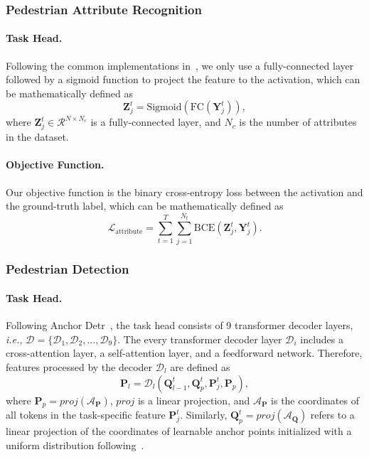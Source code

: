 \documentclass[10pt,twocolumn,letterpaper]{article}
\begin{document}
\subsubsection{Pedestrian Attribute Recognition}
\paragraph{Task Head.} Following the common implementations in~\cite{li2022label2label}, we only use a fully-connected layer followed by a sigmoid function to project the feature to the activation, which can be mathematically defined as 
\begin{equation}
    \mathbf{Z}^t_j =  \text{Sigmoid}(\text{FC}(\mathbf{Y}^t_j)),
\end{equation}
where $\mathbf{Z}^t_j \in \mathcal{R}^{N \times N_c}$  is a fully-connected layer, and $N_c$ is the number of attributes in the dataset. 
\paragraph{Objective Function.} Our objective function is the binary cross-entropy loss between the activation and the ground-truth label, which can be mathematically defined as
\begin{equation}
    \mathcal{L}_{\text{attribute}}  = \sum_{t=1}^T\sum_{j=1}^{N_t}\text{BCE}(\mathbf{Z}^t_j, \mathbf{Y}^t_j).
\end{equation}

\subsubsection{Pedestrian Detection}
\paragraph{Task Head.} Following Anchor Detr~\cite{wang2022anchor}, the task head consists of 9 transformer decoder layers, \emph{i.e.,} $\mathcal{D}\!=\!\{\mathcal{D}_1, \mathcal{D}_2, ..., \mathcal{D}_9\}$. The every transformer decoder layer $\mathcal{D}_i$ includes a cross-attention layer, a self-attention layer, and a feedforward network. Therefore, features processed by the decoder $\mathcal{D}_l$ are defined as
\begin{equation}
    \mathbf{P}_l = \mathcal{D}_l(\mathbf{Q}^t_{l-1}, \mathbf{Q}^t_p, \mathbf{P}^t_j, \mathbf{P}_p),
\end{equation}
where $\mathbf{P}_p = proj(\mathcal{A}_\mathbf{P})$, $proj$ is a linear projection, and $\mathcal{A}_\mathbf{P}$ is the coordinates of all tokens in the task-specific feature $\mathbf{P}^t_j$. Similarly, $\mathbf{Q}^t_p = proj(\mathcal{A}_\mathbf{Q})$ refers to a linear projection of the coordinates of learnable anchor points initialized with a uniform distribution following~\cite{wang2022anchor}. 
\end{document}
